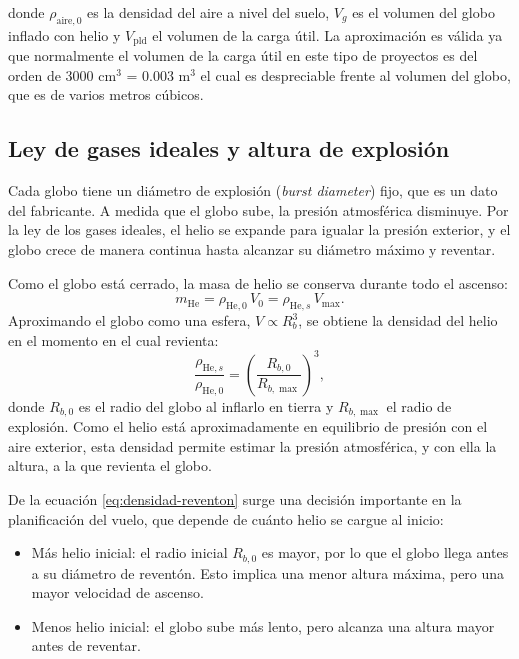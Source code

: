 \documentclass[12pt,a4paper]{article}
\begin{document}
donde $\rho_{\text{aire},0}$ es la densidad del aire a nivel del suelo, $V_g$ es el volumen del globo inflado con helio y  $V_{\text{pld}}$ el volumen de la carga útil. La aproximación es válida ya que normalmente el volumen de la carga útil en este tipo de proyectos es del orden de 3000 cm$^3$ = 0.003 m$^3$ el cual es despreciable frente al volumen del globo, que es de varios metros cúbicos.

\subsection{Ley de gases ideales y altura de explosión}\label{ley-de-gases-ideales-y-altura-de-explosion}

Cada globo tiene un diámetro de explosión (\textit{burst diameter}) fijo, que es un dato del fabricante. A medida que el globo sube, la presión atmosférica disminuye. Por la ley de los gases ideales, el helio se expande para igualar la presión exterior, y el globo crece de manera continua hasta alcanzar su diámetro máximo y reventar.
 
Como el globo está cerrado, la masa de helio se conserva durante todo el ascenso:
\begin{equation}
  m_{\text{He}} = \rho_{\text{He},0}\, V_0 = \rho_{\text{He},s}\, V_{\max}.
\end{equation}
Aproximando el globo como una esfera, $V \propto R_b^{3}$, se obtiene la densidad del helio en el momento en el cual revienta:
\begin{equation}
  \frac{\rho_{\text{He},s}}{\rho_{\text{He},0}} = \left(\frac{R_{b,0}}{R_{b,\max}}\right)^{3},
  \label{eq:densidad-reventon}
\end{equation}
donde $R_{b,0}$ es el radio del globo al inflarlo en tierra y $R_{b,\max}$ el radio de explosión. Como el helio está aproximadamente en equilibrio de presión con el aire exterior, esta densidad permite estimar la presión atmosférica, y con ella la altura, a la que revienta el globo.
 
De la ecuación \eqref{eq:densidad-reventon} surge una decisión importante en la planificación del vuelo, que depende de cuánto helio se cargue al inicio:
 
\begin{itemize}
\item
  Más helio inicial: el radio inicial $R_{b,0}$ es mayor, por lo que el globo llega antes a su diámetro de reventón. Esto implica una menor altura máxima, pero una mayor velocidad de ascenso.
\item
  Menos helio inicial: el globo sube más lento, pero alcanza una altura mayor antes de reventar.
\end{itemize}
 
\end{document}
